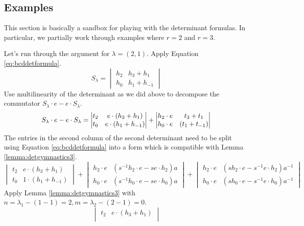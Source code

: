 \subsection{Examples}
This section is basically a sandbox for playing with the determinant formulas. In particular, we partially work through examples where $r=2$ and $r=3$. 
\begin{example}
Let's run through the argument for $\lambda = (2, 1)$. Apply Equation \eqref{eq:bcddetformula}.
\[
S_\lambda = 
\begin{vmatrix}
h_2 & h_3 + h_1 \\
h_0 & h_1 + h_{-1}
\end{vmatrix}
\]
Use multilinearity of the determinant as we did above to decompose the commutator $S_\lambda \cdot e - e \cdot S_\lambda$.
\begin{equation*}
S_\lambda \cdot e - e \cdot S_\lambda = 
\begin{vmatrix}
t_2 & e \cdot ( h_3 + h_1 ) \\
t_0 & e \cdot ( h_1 + h_{-1} )
\end{vmatrix}
+
\begin{vmatrix}
h_2 \cdot e & t_3 + t_1 \\
h_0 \cdot e & (t_1 + t_{-1} )
\end{vmatrix} \\
\end{equation*}
The entries in the second column of the second determinant need to be split using Equation \eqref{eq:bcddetformula} into a form which is compatible with Lemma \ref{lemma:detgymnastics3}.
\[
\begin{vmatrix}
t_2 & e \cdot ( h_3 + h_1 ) \\
t_0 & 1 \cdot ( h_1 + h_{-1} )
\end{vmatrix}
+
\begin{vmatrix}
h_2 \cdot e & ( s^{-1} h_2 \cdot e - s e \cdot h_2 ) a \\
h_0 \cdot e & ( s^{-1} h_0 \cdot e - s e \cdot h_0 ) a
\end{vmatrix} 
+
\begin{vmatrix}
h_2 \cdot e & ( s h_2 \cdot e - s^{-1} e \cdot h_2 ) a^{-1} \\
h_0 \cdot e & ( s h_0 \cdot e - s^{-1} e \cdot h_0 ) a^{-1}
\end{vmatrix}
\]
Apply Lemma \ref{lemma:detgymnastics3} with $n=\lambda_1 - (1-1) = 2, m=\lambda_2 - (2-1) = 0$.
\[
\begin{vmatrix}
t_2 & e \cdot ( h_3 + h_1 ) \\

\end{vmatrix}\]
\end{example}
